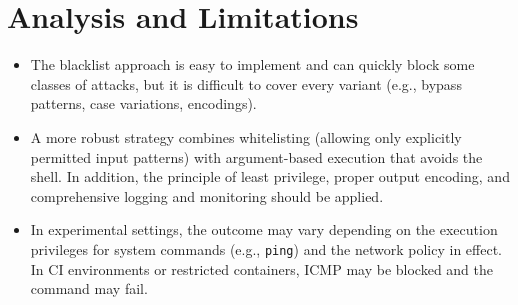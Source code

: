 \documentclass{article}
\begin{document}
\section{Analysis and Limitations}
\begin{itemize}
\item The blacklist approach is easy to implement and can quickly block some classes of attacks, but it is difficult to cover every variant (e.g., bypass patterns, case variations, encodings).
\item A more robust strategy combines whitelisting (allowing only explicitly permitted input patterns) with argument-based execution that avoids the shell. In addition, the principle of least privilege, proper output encoding, and comprehensive logging and monitoring should be applied.
\item In experimental settings, the outcome may vary depending on the execution privileges for system commands (e.g., \texttt{ping}) and the network policy in effect. In CI environments or restricted containers, ICMP may be blocked and the command may fail.
\end{itemize}

\newpage
\appendix
\end{document}
